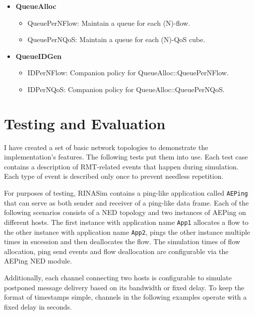         \begin{itemize}
            \item \textbf{QueueAlloc}
            \begin{itemize}
                \item QueuePerNFlow: Maintain a queue for each (N)-flow.
                \item QueuePerNQoS: Maintain a queue for each (N)-QoS cube.
            \end{itemize}
            \item \textbf{QueueIDGen}
            \begin{itemize}
                \item IDPerNFlow: Companion policy for QueueAlloc::QueuePerNFlow.
                \item IDPerNQoS: Companion policy for QueueAlloc::QueuePerNQoS.
            \end{itemize}
        \end{itemize}


\chapter{Testing and Evaluation}\label{testing}

    I have created a set of basic network topologies to demonstrate the implementation's features. The following tests put them into use.
    Each test case contains a description of RMT-related events that happen during simulation. Each type of event is described only once to prevent needless repetition.

    For purposes of testing, RINASim contains a ping-like application called \texttt{AEPing} that can serve as both sender and receiver of a ping-like data frame. Each of the following scenarios consists of a NED topology and two instances of AEPing on different hosts. The first instance with application name \texttt{App1} allocates a flow to the other instance with application name \texttt{App2}, pings the other instance multiple times in sucession and then deallocates the flow. The simulation times of flow allocation, ping send events and flow deallocation are configurable via the AEPing NED module.

    Additionally, each channel connecting two hosts is configurable to simulate postponed message delivery based on its bandwidth or fixed delay. To keep the format of timestamps simple, channels in the following examples operate with a fixed delay in seconds.

